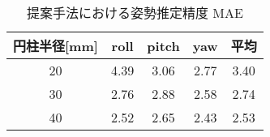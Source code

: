 \documentclass{jsarticle}
\begin{document}



\begin{table}[h]
        \vspace{0zh}
          \begin{center}
            \caption{提案手法における姿勢推定精度 MAE}
            \label{hyouka}
            \begin{tabular}{c|c|c|c|c} \hline
              円柱半径[mm]   & roll& pitch & yaw&平均 \\ \hline
              20& 4.39 & 3.06 & 2.77 &3.40\\ \hline
              30&2.76 & 2.88 & 2.58& 2.74 \\ \hline
              40&2.52 &2.65  &2.43&2.53 \\ \hline
              \end{tabular}
          \end{center}
        \vspace{-1.0zh}
\end{table}



\end{document}
